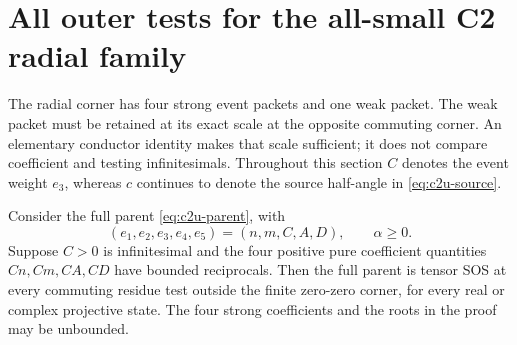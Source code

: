 \section{All outer tests for the all-small C2 radial family}
\label{sec:c2-radial-all-tests}

The radial corner has four strong event packets and one weak packet.
The weak packet must be retained at its exact scale at the opposite
commuting corner.  An elementary conductor identity makes that scale
sufficient; it does not compare coefficient and testing infinitesimals.
Throughout this section $C$ denotes the event weight $e_3$, whereas $c$
continues to denote the source half-angle in \eqref{eq:c2u-source}.

\begin{lemma}
\label{lem:c2-four-strong-outer}
Consider the full parent \eqref{eq:c2u-parent}, with
\[
 (e_1,e_2,e_3,e_4,e_5)=(n,m,C,A,D),\qquad \alpha\geq0.
\]
Suppose $C>0$ is infinitesimal and the four positive pure coefficient
quantities $Cn,Cm,CA,CD$ have bounded reciprocals.  Then the full parent
is tensor SOS at every commuting residue test outside the finite
zero-zero corner, for every real or complex projective state.
The four strong coefficients and the roots in the proof may be unbounded.
\end{lemma}


